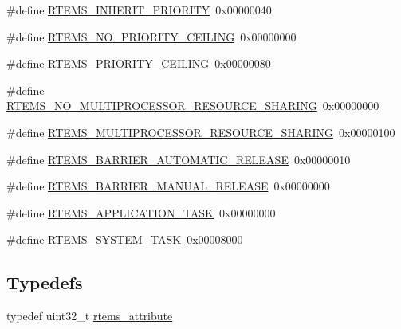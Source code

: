 \begin{DoxyCompactItemize}
\#define \mbox{\hyperlink{group__ClassicAttributes_ga35ec5908dc2f9b27ea1e273fa3ce79a1}{R\+T\+E\+M\+S\+\_\+\+I\+N\+H\+E\+R\+I\+T\+\_\+\+P\+R\+I\+O\+R\+I\+TY}}~0x00000040
\item 
\#define \mbox{\hyperlink{group__ClassicAttributes_gace8723c3fcc4ae0b2c5fbe9ec313d6af}{R\+T\+E\+M\+S\+\_\+\+N\+O\+\_\+\+P\+R\+I\+O\+R\+I\+T\+Y\+\_\+\+C\+E\+I\+L\+I\+NG}}~0x00000000
\item 
\#define \mbox{\hyperlink{group__ClassicAttributes_ga91be26357eaf5275533aef61c9ac199e}{R\+T\+E\+M\+S\+\_\+\+P\+R\+I\+O\+R\+I\+T\+Y\+\_\+\+C\+E\+I\+L\+I\+NG}}~0x00000080
\item 
\#define \mbox{\hyperlink{group__ClassicAttributes_gaabcc3aad32e832786b10c782c571617a}{R\+T\+E\+M\+S\+\_\+\+N\+O\+\_\+\+M\+U\+L\+T\+I\+P\+R\+O\+C\+E\+S\+S\+O\+R\+\_\+\+R\+E\+S\+O\+U\+R\+C\+E\+\_\+\+S\+H\+A\+R\+I\+NG}}~0x00000000
\item 
\#define \mbox{\hyperlink{group__ClassicAttributes_ga6c70b7ca8adb4f3588ebe1ae7bd9cfce}{R\+T\+E\+M\+S\+\_\+\+M\+U\+L\+T\+I\+P\+R\+O\+C\+E\+S\+S\+O\+R\+\_\+\+R\+E\+S\+O\+U\+R\+C\+E\+\_\+\+S\+H\+A\+R\+I\+NG}}~0x00000100
\item 
\#define \mbox{\hyperlink{group__ClassicAttributes_gacea692c6eef2c867363d0423bf8ba9ea}{R\+T\+E\+M\+S\+\_\+\+B\+A\+R\+R\+I\+E\+R\+\_\+\+A\+U\+T\+O\+M\+A\+T\+I\+C\+\_\+\+R\+E\+L\+E\+A\+SE}}~0x00000010
\item 
\#define \mbox{\hyperlink{group__ClassicAttributes_ga10fdb85c61e7cfe42a31387fbf7bd9f5}{R\+T\+E\+M\+S\+\_\+\+B\+A\+R\+R\+I\+E\+R\+\_\+\+M\+A\+N\+U\+A\+L\+\_\+\+R\+E\+L\+E\+A\+SE}}~0x00000000
\item 
\#define \mbox{\hyperlink{group__ClassicAttributes_gaac7b323892879f425f0ea7106cb99150}{R\+T\+E\+M\+S\+\_\+\+A\+P\+P\+L\+I\+C\+A\+T\+I\+O\+N\+\_\+\+T\+A\+SK}}~0x00000000
\item 
\#define \mbox{\hyperlink{group__ClassicAttributes_ga399eca8780d45f30c28e6bd9a806caf2}{R\+T\+E\+M\+S\+\_\+\+S\+Y\+S\+T\+E\+M\+\_\+\+T\+A\+SK}}~0x00008000
\end{DoxyCompactItemize}
\subsection*{Typedefs}
\begin{DoxyCompactItemize}
\item 
typedef uint32\+\_\+t \mbox{\hyperlink{group__ClassicAttributes_gaea40313cf78ed843e09c4315d0a10f79}{rtems\+\_\+attribute}}
\end{DoxyCompactItemize}


